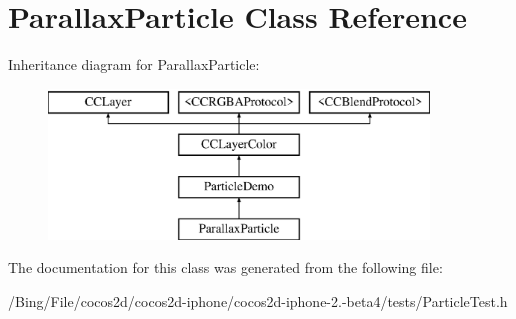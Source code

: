 \hypertarget{interface_parallax_particle}{\section{Parallax\-Particle Class Reference}
\label{interface_parallax_particle}
}
Inheritance diagram for Parallax\-Particle\-:\begin{figure}[H]
\begin{center}
\leavevmode
\includegraphics[height=4.000000cm]{interface_parallax_particle}
\end{center}
\end{figure}


The documentation for this class was generated from the following file\-:\begin{DoxyCompactItemize}
\item 
/\-Bing/\-File/cocos2d/cocos2d-\/iphone/cocos2d-\/iphone-\/2.-\/beta4/tests/Particle\-Test.\-h\end{DoxyCompactItemize}
